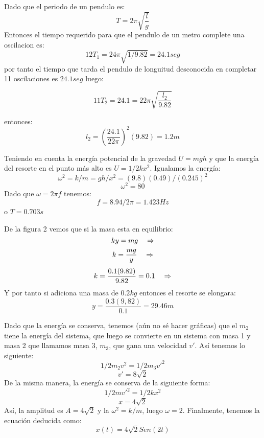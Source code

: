 \documentclass[a4paper]{article}
\begin{document}
\begin{answer}[Problema 7.]

    Dado que el periodo de un pendulo es:
    \begin{equation*}
        T = 2\pi \sqrt{\frac{l}{g}}
    \end{equation*}
    Entonces el tiempo requerido para que el pendulo de un metro complete una oscilacion es:
    $$12 T_1 = 24\pi\sqrt{1/9.82} = 24.1seg$$
    por tanto el tiempo que tarda el pendulo de longuitud desconocida en completar 11 oscilaciones es $24.1seg$ luego:

    $$11 T_2 = 24.1 = 22\pi \sqrt{\frac{l_2}{9.82}}$$

    entonces:
    $$l_2 = \left(\frac{24.1}{22\pi}\right)^2(9.82) = 1.2 m$$
\end{answer}

\begin{answer}[8.]
    Teniendo en cuenta la energía potencial de la gravedad $U = mgh$ y que la energía del resorte en el punto más alto es $U = 1/2 kx^2$. Igualamos la energía:
    $$\omega^2 = k/m = gh/x^2 = (9.8)(0.49)/(0.245)^2$$
    $$ \omega^2 = 80 $$
    Dado que $\omega = 2\pi f$ tenemos:
    $$ f = 8.94/2\pi = 1.423 Hz$$
    o $T =  0.703 s$

\end{answer}

\begin{answer}[Problema 9.]
    De la figura 2 vemos que si la masa esta en equilibrio:
    $$ky = mg\hspace{0.35cm}\Rightarrow$$
    $$k = \frac{mg}{y}\hspace{0.35cm}\Rightarrow$$
    $$k = \frac{0.1(9.82) }{9.82} = 0.1\hspace{0.35cm}\Rightarrow$$
    Y por tanto si adiciona una masa de $0.2kg$
    entonces el resorte se elongara:
    $$y = \frac{0.3(9,82)}{0.1} = 29.46m$$
\end{answer}

\begin{answer}[10).]
    Dado que la energía se conserva, tenemos (aún no sé hacer gráficas) que el $m_2$ tiene la energía del sistema, que luego se convierte en un sistema con masa 1 y masa 2 que llamamos masa 3, $m_3$, que gana una velocidad $v'$.
    Así tenemos lo siguiente:
    $$ 1/2 m_2 v^2 = 1/2 m_3 v'^2 $$
    $$ v' = 8 \sqrt{2} $$
    De la misma manera, la energía se conserva de la siguiente forma:
    $$ 1/2 m v'^2 = 1/2 kx^2 $$
    $$ x = 4 \sqrt{2} $$
    Así, la amplitud es $A = 4 \sqrt{2}$ y la $\omega^2 = k/m$, luego $\omega = 2$.
    Finalmente, tenemos la ecuación deducida como:
    $$ x(t) = 4\sqrt{2} Sen(2 t) $$

\end{answer}
\end{document}
